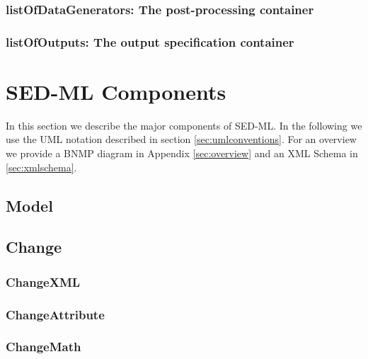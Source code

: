  \subsubsection{listOfDataGenerators: The post-processing container}
 

 \subsubsection{listOfOutputs: The output specification container}
 



\section{SED-ML Components}
In this section we describe the major components of SED-ML. In the following we 
use the UML notation described in section \ref{sec:umlconventions}. For an overview we 
provide a BNMP diagram in Appendix \ref{sec:overview} and an XML Schema in 
\ref{sec:xmlschema}. 

  \subsection{Model}
  

  \subsection{Change}
  

  \subsubsection{ChangeXML}
  

  \subsubsection{ChangeAttribute}
  

  \subsubsection{ChangeMath}
  

